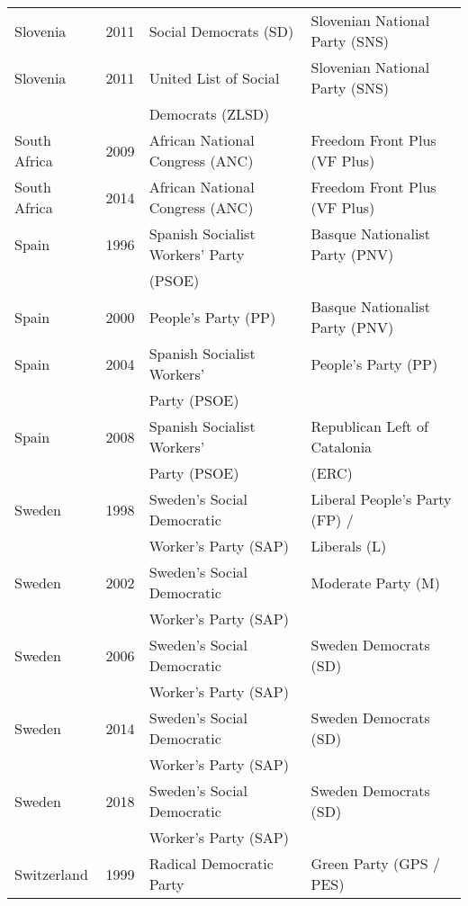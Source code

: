 {\begin{longtable}{|l|c|l|l|}
   Slovenia & 2011 &   Social Democrats (SD)  &   Slovenian National Party (SNS) \\ 
   Slovenia & 2011 &   United List of Social  &   Slovenian National Party (SNS) \\ 
               &      &     Democrats (ZLSD)    &     \\ 
   South Africa & 2009 &   African National Congress (ANC)   &   Freedom Front Plus (VF Plus) \\ 
   South Africa & 2014 &   African National Congress (ANC)   &   Freedom Front Plus (VF Plus) \\ 
   Spain & 1996 &   Spanish Socialist Workers' Party  &   Basque Nationalist Party (PNV)   \\ 
               &      &     (PSOE)  &     \\ 
   Spain & 2000 &   People's Party (PP) &   Basque Nationalist Party (PNV)   \\ 
   Spain & 2004 &   Spanish Socialist Workers' &   People's Party (PP) \\ 
               &      &     Party (PSOE)     &     \\ 
  Spain & 2008 &   Spanish Socialist Workers'  &   Republican Left of Catalonia  \\ 
               &      &       Party (PSOE)  &    (ERC) \\ 
   Sweden & 1998 &   Sweden's   Social Democratic &   Liberal People's Party (FP) /  \\ 
               &      &  Worker's Party (SAP)      &    Liberals (L)   \\ 
   Sweden & 2002 &   Sweden's   Social Democratic  &   Moderate Party (M) \\ 
               &      &      Worker's Party (SAP)  &     \\ 
   Sweden & 2006 &   Sweden's   Social Democratic  &   Sweden Democrats (SD) \\ 
               &      &   Worker's Party (SAP)     &     \\ 
   Sweden & 2014 &   Sweden's   Social Democratic  &   Sweden Democrats (SD) \\ 
               &      &   Worker's Party (SAP)     &     \\ 
   Sweden & 2018 &   Sweden's   Social Democratic  &   Sweden Democrats (SD) \\ 
               &      &     Worker's Party (SAP)   &     \\ 
   Switzerland & 1999 &   Radical Democratic Party  &   Green Party (GPS / PES) \\ 

\end{longtable}}
